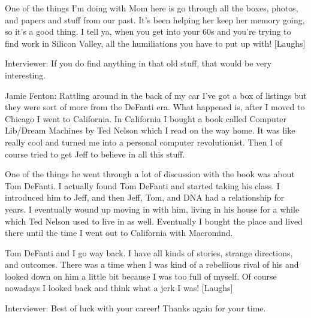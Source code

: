 One of the things I’m doing with Mom here is go through all the boxes, photos, and papers and stuff from our past. It’s been helping her keep her memory going, so it’s a good thing. I tell ya, when you get into your 60s and you’re trying to find work in Silicon Valley, all the humiliations you have to put up with! [Laughs]

\textcolor{interviewer}{Interviewer:} If you do find anything in that old stuff, that would be very interesting.

\textcolor{interviewee}{Jamie Fenton:} Rattling around in the back of my car I’ve got a box of listings but they were sort of more from the DeFanti era. What happened is, after I moved to Chicago I went to California. In California I bought a book called Computer Lib/Dream Machines by Ted Nelson which I read on the way home. It was like really cool and turned me into a personal computer revolutionist. Then I of course tried to get Jeff to believe in all this stuff.

One of the things he went through a lot of discussion with the book was about Tom DeFanti. I actually found Tom DeFanti and started taking his class. I introduced him to Jeff, and then Jeff, Tom, and DNA had a relationship for years. I eventually wound up moving in with him, living in his house for a while which Ted Nelson used to live in as well. Eventually I bought the place and lived there until the time I went out to California with Macromind.

Tom DeFanti and I go way back. I have all kinds of stories, strange directions, and outcomes. There was a time when I was kind of a rebellious rival of his and looked down on him a little bit because I was too full of myself. Of course nowadays I looked back and think what a jerk I was! [Laughs] 

\textcolor{interviewer}{Interviewer:} Best of luck with your career! Thanks again for your time.